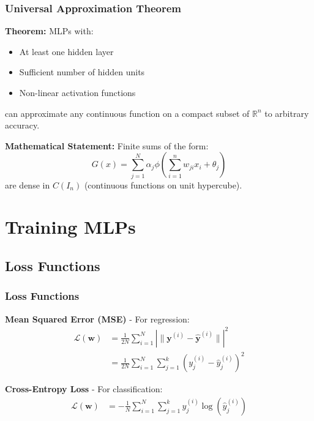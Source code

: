 \documentclass{beamer}
\begin{document}
\begin{frame}
\frametitle{Universal Approximation Theorem}
\textbf{Theorem:} MLPs with:
\begin{itemize}
    \item At least one hidden layer
    \item Sufficient number of hidden units
    \item Non-linear activation functions
\end{itemize}

can approximate any continuous function on a compact subset of $\mathbb{R}^n$ to arbitrary accuracy.

\vspace{1em}

\textbf{Mathematical Statement:}
Finite sums of the form:
\begin{equation}
G(x) = \sum_{j=1}^{N} \alpha_j \phi\left(\sum_{i=1}^{n} w_{ji} x_i + \theta_j\right)
\end{equation}
are dense in $C(I_n)$ (continuous functions on unit hypercube).
\end{frame}

\section{Training MLPs}

\subsection{Loss Functions}
\begin{frame}
\frametitle{Loss Functions}
\textbf{Mean Squared Error (MSE)} - For regression:
\begin{align}
\mathcal{L}(\boldsymbol{w}) &= \frac{1}{2N} \sum_{i=1}^{N} |\|\boldsymbol{y}^{(i)} - \hat{\boldsymbol{y}}^{(i)}\||^2 \\
&= \frac{1}{2N} \sum_{i=1}^{N} \sum_{j=1}^{k} (y_j^{(i)} - \hat{y}_j^{(i)})^2
\end{align}

\textbf{Cross-Entropy Loss} - For classification:
\begin{align}
\mathcal{L}(\boldsymbol{w}) &= -\frac{1}{N} \sum_{i=1}^{N} \sum_{j=1}^{k} y_j^{(i)} \log(\hat{y}_j^{(i)})
\end{align}
\end{frame}
\end{document}
